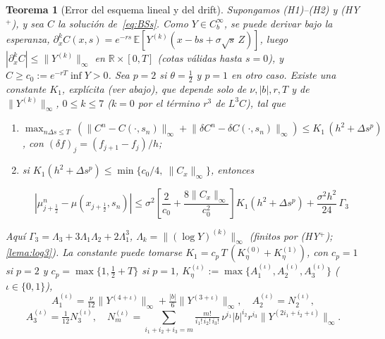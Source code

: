 \documentclass[11pt,letterpaper]{article}
\theoremstyle{plain}
\newtheorem{teorema}[theorem]{Teorema}
\theoremstyle{definition}
\theoremstyle{remark}
\numberwithin{equation}{section}
\newcommand{\R}{\mathbb{R}}
\newcommand{\E}{\mathbb{E}}
\newcommand{\norm}[1]{\lVert #1\rVert}
\begin{document}
	\begin{teorema}[Error del esquema lineal y del drift]\label{teo:error}
		Supongamos (H1)--(H2) y (HY\(^+\)), y sea \(C\) la solución de~\eqref{eq:BSs}. Como \(Y\in C_b^\infty\), se puede derivar bajo la esperanza, \(\partial_x^kC(x,s)=e^{-rs}\,\E\left[Y^{(k)}(x-bs+\sigma\sqrt{s}\,Z)\right]\), luego \(|\partial_x^kC|\le\norm{Y^{(k)}}_\infty\) en \(\R\times[0,T]\) (cotas válidas hasta \(s=0\)), y \(C\ge c_0:=e^{-rT}\inf Y>0\). Sea \(p=2\) si \(\theta=\frac12\) y \(p=1\) en otro caso. Existe una constante \(K_1\), explícita (ver abajo), que depende solo de \(\nu,|b|,r,T\) y de \(\norm{Y^{(k)}}_\infty\), \(0\le k\le 7\) (\(k=0\) por el término \(r^3\) de \(L^3C\)), tal que
		
		\begin{enumerate}[label=(\roman*)]
			\item \(\displaystyle\max_{n\Delta s\le T}\ \left(\norm{C^n-C(\cdot,s_n)}_\infty+\norm{\delta C^n-\delta C(\cdot,s_n)}_\infty\right)\le K_1\,(h^2+\Delta s^{p})\), con \((\delta f)_j=(f_{j+1}-f_j)/h\);
			\item si \(K_1(h^2+\Delta s^p)\le\min\{c_0/4,\ \norm{C_x}_\infty\}\), entonces
			
			\[
			\left|\mu^n_{j+\frac12}-\mu(x_{j+\frac12},s_n)\right|\le\sigma^2\left[\frac{2}{c_0}+\frac{8\norm{C_x}_\infty}{c_0^2}\right]K_1(h^2+\Delta s^p)+\frac{\sigma^2h^2}{24}\,\Gamma_3
			\]
		\end{enumerate}
		Aquí \(\Gamma_3=\Lambda_3+3\Lambda_1\Lambda_2+2\Lambda_1^3\), \(\Lambda_k=\norm{(\log Y)^{(k)}}_\infty\) (finitos por (HY\(^+\)); \cref{lema:log3}). La constante puede tomarse \(K_1=c_p\,T\,(K_\eta^{(0)}+K_\eta^{(1)})\), con \(c_p=1\) si \(p=2\) y \(c_p=\max\{1,\frac12+T\}\) si \(p=1\), \(K_\eta^{(\iota)}:=\max\{A_1^{(\iota)},A_2^{(\iota)},A_3^{(\iota)}\}\) (\(\iota\in\{0,1\}\)),
		\[
		A_1^{(\iota)}=\tfrac\nu{12}\norm{Y^{(4+\iota)}}_\infty+\tfrac{|b|}6\norm{Y^{(3+\iota)}}_\infty,\quad A_2^{(\iota)}=N_2^{(\iota)},
		\]
		\[
		A_3^{(\iota)}=\tfrac1{12}N_3^{(\iota)},\quad N_m^{(\iota)}=\sum_{i_1+i_2+i_3=m}\tfrac{m!}{i_1!\,i_2!\,i_3!}\,\nu^{i_1}|b|^{i_2}r^{i_3}\norm{Y^{(2i_1+i_2+\iota)}}_\infty .
		\]
	\end{teorema}
	
\end{document}
